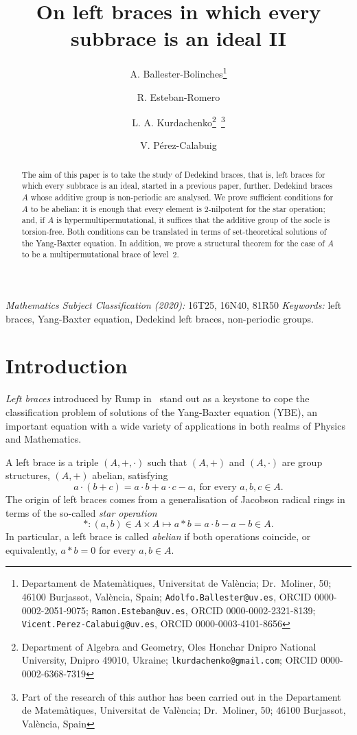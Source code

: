 \documentclass[12pt, a4paper, english]{article}
\title{On left braces in which every subbrace is an ideal II}
\author{A. Ballester-Bolinches\thanks{Departament de Matem{\`a}tiques, Universitat de Val{\`e}ncia; Dr.\ Moliner, 50; 46100 Burjassot, Val\`encia, Spain; \texttt{Adolfo.Ballester@uv.es}, ORCID 0000-0002-2051-9075; \texttt{Ramon.Esteban@uv.es}, ORCID 0000-0002-2321-8139; \texttt{Vicent.Perez-Calabuig@uv.es}, ORCID 0000-0003-4101-8656} \and R. Esteban-Romero\addtocounter{footnote}{-1}\footnotemark \and L. A. Kurdachenko\thanks{Department of Algebra and Geometry, Oles Honchar Dnipro National University, Dnipro 49010, Ukraine; \texttt{lkurdachenko@gmail.com}; ORCID 0000-0002-6368-7319}\ \thanks{Part of the research of this author has been carried out in the Departament de Matem{\`a}tiques, Universitat de Val{\`e}ncia; Dr.\ Moliner, 50; 46100 Burjassot, Val\`encia, Spain} \and V. P{\'e}rez-Calabuig\addtocounter{footnote}{-3}\footnotemark}
\date{}
\theoremstyle{definition}
\begin{document}
\maketitle

\begin{abstract}
The aim of this paper is to take the study of Dedekind braces, that is, left braces for which every subbrace is an ideal, started in a previous paper, further. Dedekind braces $A$ whose additive group is non-periodic are analysed. We prove sufficient conditions for $A$ to be abelian: it is enough that every element is $2$-nilpotent for the star operation; %
and, if $A$ is hypermultipermutational, it suffices that the additive group of the socle is torsion-free. Both conditions can be translated in terms of set-theoretical solutions of the Yang-Baxter equation. In addition, we prove a structural theorem for the case of $A$ to be a multipermutational brace of level~$2$.
\end{abstract}

\emph{Mathematics Subject Classification (2020):} 16T25, %
  16N40, %
  81R50 %
%
\emph{Keywords:} left braces, Yang-Baxter equation, Dedekind left braces, non-periodic groups.

\section{Introduction}
\label{sec:intro}
\emph{Left braces} introduced by Rump in~\cite{Rump07} stand out as a keystone to cope the classification problem of solutions of the Yang-Baxter equation (YBE), an important equation with a wide variety of applications in both realms of Physics and Mathematics. 

A left brace is a triple $(A,+,\cdot)$ such that $(A,+)$ and $(A,\cdot)$ are group structures, $(A,+)$  abelian, satisfying
\[ a\cdot (b+c) = a\cdot b + a \cdot c - a, \ \text{for every $a,b,c\in A$.}\]
The origin of left braces comes from a generalisation of Jacobson radical rings in terms of the so-called \emph{star operation}
\[ \ast \colon (a,b)\in A \times A \longmapsto a \ast b = a\cdot b - a - b \in A.\]
In particular, a left brace is called \emph{abelian} if both operations coincide, or equivalently, $a\ast b = 0$ for every $a,b\in A$. 
\end{document}
